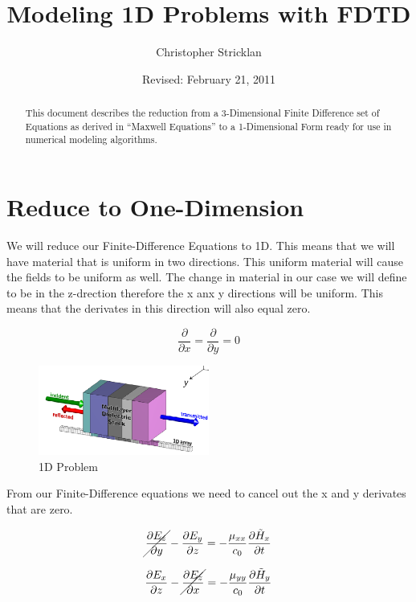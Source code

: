 \documentclass[a4paper,10pt]{article}
\title{Modeling 1D Problems with FDTD}
\author{Christopher Stricklan}
\date{Revised: February 21, 2011}
\begin{document}
\maketitle

\begin{abstract}
This document describes the reduction from a 3-Dimensional Finite Difference set of Equations as derived in ``Maxwell Equations'' to a 1-Dimensional Form ready for use in numerical modeling algorithms.
\end{abstract}

\vfill



\section{Reduce to One-Dimension}

We will reduce our Finite-Difference Equations to 1D.  This means that we will have material that is uniform in two directions.  
This uniform material will cause the fields to be uniform as well.  The change in material in our case we will define to be in the z-drection therefore the x anx y directions
will be uniform.  This means that the derivates in this direction will also equal zero.

\begin{equation*}
 \frac{\partial}{\partial x} = \frac{\partial}{\partial y}=0
\end{equation*}

\begin{figure}[h]
  \centering
    \includegraphics[width=0.5\textwidth]{Slabs1D.png}
  \caption{1D Problem}
\end{figure}


From our Finite-Difference equations we need to cancel out the x and y derivates that are zero.


\begin{equation*}
  \cancel{\frac{\partial E_z}{\partial y}} - \frac{\partial E_y}{\partial z} = -\frac{\mu_{xx}}{c_0}\frac{\partial\tilde{H}_x}{\partial t}
\end{equation*}

\begin{equation*}
  \frac{\partial E_x}{\partial z} - \cancel{\frac{\partial E_z}{\partial x}} = -\frac{\mu_{yy}}{c_0}\frac{\partial\tilde{H}_y}{\partial t}
\end{equation*}
\end{document}
